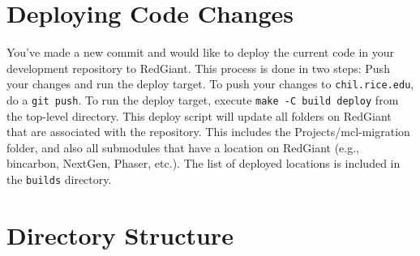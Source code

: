 \documentclass[12pt]{article} %
\newcommand{\code}[1]{\texttt{#1}}
\newcommand{\filesys}[1]{\texttt{#1}}
\begin{document}
\section{Deploying Code Changes}

You've made a new commit and would like to deploy the current code in your development repository to RedGiant.
This process is done in two steps: Push your changes and run the deploy target.
To push your changes to \filesys{chil.rice.edu}, do a \code{git push}.
To run the deploy target, execute \code{make -C build deploy} from the top-level directory.
This deploy script will update all folders on RedGiant that are associated with the repository.
This includes the Projects/mcl-migration folder, and also all submodules that have a location on RedGiant (e.g., bincarbon, NextGen, Phaser, etc.).
The list of deployed locations is included in the \filesys{builds} directory.

\section{Directory Structure} %
\end{document}
